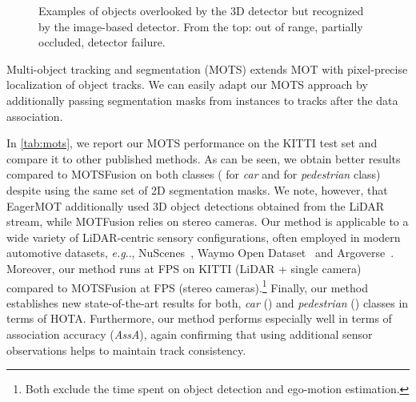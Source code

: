 \documentclass[letterpaper, 10 pt, conference]{ieeeconf}
\makeatletter
\DeclareRobustCommand\onedot{\futurelet\@let@token\@onedot}
\def\@onedot{\ifx\@let@token.\else.\null\fi\xspace}
\def\eg{\emph{e.g}\onedot} \def\Eg{\emph{E.g}\onedot}
\newcommand{\PAR}[1]{\vskip4pt \noindent {\bf #1~}}
\makeatother
\begin{document}
\begin{figure}[ht]
\setlength{\fboxsep}{0.3pt}\vspace{+8pt}
\begin{center}
\end{center}
\vspace{-7pt}
\caption{Examples of objects overlooked by the 3D detector but recognized by the image-based detector. 
From the top: out of range, partially occluded, detector failure.
}
\label{fig:missed_detections}
\end{figure}


\PAR{KITTI MOTS.}
Multi-object tracking and segmentation (MOTS) extends MOT with pixel-precise localization of object tracks. 
We can easily adapt our MOTS approach by additionally passing segmentation masks from instances to tracks after the data association. 

In \autoref{tab:mots}, we report our MOTS performance on the KITTI test set and compare it to other published methods.
As can be seen, we obtain better results compared to MOTSFusion on both classes ( for \textit{car} and  for \textit{pedestrian} class) despite using the same set of 2D segmentation masks. 
We note, however, that EagerMOT additionally used 3D object detections obtained from the LiDAR stream, while MOTFusion relies on stereo cameras. Our method is applicable to a wide variety of LiDAR-centric sensory configurations, often employed in modern automotive datasets, \eg, NuScenes~\cite{nuscenes2019}, Waymo Open Dataset~\cite{sun2020scalability} and Argoverse~\cite{chang2019argoverse}. 
Moreover, our method runs at  FPS on KITTI (LiDAR + single camera) compared to MOTSFusion at  FPS (stereo cameras).\footnote{Both exclude the time spent on object detection and ego-motion estimation.} 
Finally, our method establishes new state-of-the-art results for both, \textit{car} () and \textit{pedestrian} () classes in terms of HOTA. Furthermore, our method performs especially well in terms of association accuracy (\textit{AssA}), again confirming that using additional sensor observations helps to maintain track consistency.
\end{document}
